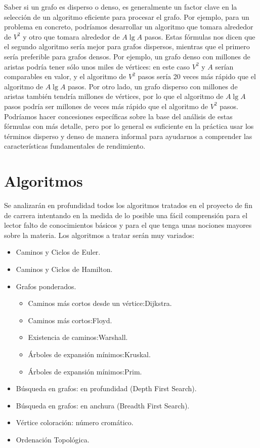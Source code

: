 \documentclass[a4paper,12pt]{article}
\begin{document}
Saber si un grafo es disperso o denso, es generalmente un factor clave en la selección de un algoritmo eficiente para procesar el grafo. Por ejemplo, para un problema en concreto, podríamos desarrollar un algoritmo que tomara alrededor de $V^2$ y otro que tomara alrededor de $A \lg A$ pasos. Estas fórmulas nos dicen que el segundo algoritmo sería mejor para grafos dispersos, mientras que el primero sería preferible para grafos densos. Por ejemplo, un grafo denso con millones de aristas podría tener sólo unos miles de vértices: en este caso $V^2$ y $A$ serían comparables en valor, y el algoritmo de $V^2$ pasos sería 20 veces más rápido que el algoritmo de $A \lg A$ pasos. Por otro lado, un grafo disperso con millones de aristas también tendría millones de vértices, por lo que el algoritmo de $A \lg A$ pasos podría ser millones de veces más rápido que el algoritmo de $V^2$ pasos. Podríamos hacer concesiones específicas sobre la base del análisis de estas fórmulas con más detalle, pero por lo general es suficiente en la práctica usar los términos disperso y denso de manera informal para ayudarnos a comprender las características fundamentales de rendimiento.\\

\section{Algoritmos}

Se analizarán en profundidad todos los algoritmos tratados en el proyecto de fin de carrera intentando en la medida de lo posible una fácil comprensión para el lector falto de conocimientos básicos y para el que tenga unas nociones mayores sobre la materia. Los algoritmos a tratar serán muy variados:
\begin{itemize}
\item Caminos y Ciclos de Euler.
\item Caminos y Ciclos de Hamilton.
\item Grafos ponderados.
\begin{itemize}
\item Caminos más cortos desde un vértice:Dijkstra.
\item Caminos más cortos:Floyd.
\item Existencia de caminos:Warshall.
\item Árboles de expansión mínimos:Kruskal.
\item Árboles de expansión mínimos:Prim.
\end{itemize}
\item Búsqueda en grafos: en profundidad (Depth First Search).
\item Búsqueda en grafos: en anchura (Breadth First Search).
\item Vértice coloración: número cromático.
\item Ordenación Topológica.
\end{itemize}
\end{document}
